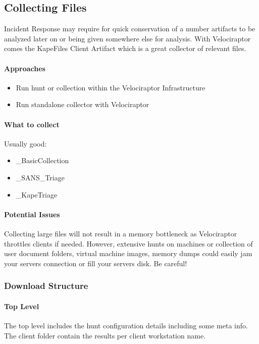 \subsection{Collecting Files}
Incident Response may require for quick conservation of a number artifacts to be analyzed later on or being given somewhere else for analysis. 
With Velociraptor comes the KapeFiles Client Artifact which is a great collector of relevant files.

\paragraph{Approaches}
\begin{itemize}
  \item Run hunt or collection within the Velociraptor Infrastructure
  \item Run standalone collector with Velociraptor
\end{itemize}

\paragraph{What to collect}
Usually good:
\begin{itemize}
  \item \_BasicCollection
  \item \_SANS\_Triage
  \item \_KapeTriage
\end{itemize}

\paragraph{Potential Issues}
Collecting large files will not result in a memory bottleneck as Velociraptor throttles clients if needed. However, extensive hunts on machines or collection of user document folders, virtual machine images, memory dumps could easily jam your servers connection or fill your servers disk. Be careful!

\subsubsection{Download Structure}
\paragraph{Top Level}
The top level includes the hunt configuration details including some meta info.
The client folder contain the results per client workstation name.

